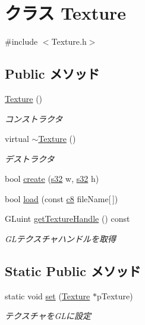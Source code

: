 \hypertarget{class_texture}{\section{クラス Texture}
\label{class_texture}
}


{\ttfamily \#include $<$Texture.\-h$>$}

\subsection*{Public メソッド}
\begin{DoxyCompactItemize}
\item 
\hyperlink{class_texture_a6c275e3f186675ff6ed73ccf970e552f}{Texture} ()
\begin{DoxyCompactList}\small\item\em コンストラクタ \end{DoxyCompactList}\item 
virtual \hyperlink{class_texture_a09c4bcb7462f64c1d20fa69dba3cee8a}{$\sim$\-Texture} ()
\begin{DoxyCompactList}\small\item\em デストラクタ \end{DoxyCompactList}\item 
bool \hyperlink{class_texture_aa894d750673a53e42cc89bb7b62acea1}{create} (\hyperlink{_main_8h_a0ce6887c26c1c49ad3be5710dd42bfd6}{s32} w, \hyperlink{_main_8h_a0ce6887c26c1c49ad3be5710dd42bfd6}{s32} h)
\item 
bool \hyperlink{class_texture_a1c6b51ed04862c1dd795c62005db4129}{load} (const \hyperlink{_main_8h_aa1ba8aac9fcd831012308297336ac74b}{c8} file\-Name\mbox{[}$\,$\mbox{]})
\item 
G\-Luint \hyperlink{class_texture_ad48a156766fb1ac1804690e06f2a7d94}{get\-Texture\-Handle} () const 
\begin{DoxyCompactList}\small\item\em G\-Lテクスチャハンドルを取得 \end{DoxyCompactList}\end{DoxyCompactItemize}
\subsection*{Static Public メソッド}
\begin{DoxyCompactItemize}
\item 
static void \hyperlink{class_texture_a9895b77310c2cd7118a6a47f562b205a}{set} (\hyperlink{class_texture}{Texture} $\ast$p\-Texture)
\begin{DoxyCompactList}\small\item\em テクスチャを\-G\-Lに設定 \end{DoxyCompactList}\end{DoxyCompactItemize}


